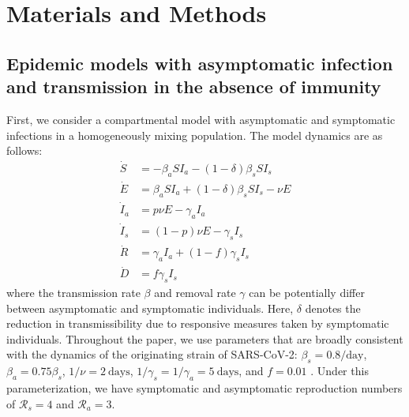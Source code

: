 \documentclass[12pt]{article}
\newcommand{\RR}{\ensuremath{{\mathcal R}}\xspace}
\begin{document}
\pagebreak

\section*{Materials and Methods}
\setcounter{figure}{0}
\renewcommand{\thefigure}{S\arabic{figure}}
\renewcommand{\thetable}{S\arabic{table}}

\subsection*{Epidemic models with asymptomatic infection and transmission in the absence of immunity}

First, we consider a compartmental model with asymptomatic and symptomatic infections in a homogeneously mixing population.
The model dynamics are as follows:
\begin{align}
\dot{S} &= -\beta_a S I_a -(1-\delta) \beta_s S I_s \\
\dot{E} &= \beta_a S I_a + (1-\delta) \beta_s S I_s - \nu E\\
\dot{I}_a &= p \nu E - \gamma_a I_a\\
\dot{I}_s &= (1-p) \nu E -\gamma_s I_s\\
\dot{R} &= \gamma_a I_a + (1-f) \gamma_s I_s \\
\dot{D} &= f \gamma_s I_s
\end{align}
where the transmission rate $\beta$ and removal rate $\gamma$ can be potentially differ between asymptomatic and symptomatic individuals.  
Here, $\delta$ denotes the reduction in transmissibility due to responsive measures taken by symptomatic individuals.
Throughout the paper, we use parameters that are broadly consistent with the dynamics of the originating strain of SARS-CoV-2: $\beta_s = 0.8/\mathrm{day}$, $\beta_a = 0.75 \beta_s$, $1/\nu=2\ \mathrm{days}$, $1/\gamma_s=1/\gamma_a=5\ \mathrm{days}$, and $f=0.01$ \citep{park2020reconciling}.
Under this parameterization, we have symptomatic and asymptomatic reproduction numbers of $\RR_s = 4$ and $\RR_a = 3$.
\end{document}

